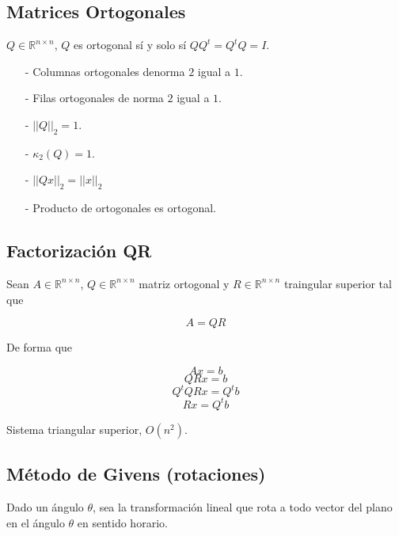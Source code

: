 
\subsection{Matrices Ortogonales}\label{subsec:matrices_ortogonales}

$Q \in \mathbb{R}^{n \times n}$, $Q$ es ortogonal sí y solo sí $QQ^t = Q^t Q = I$.

\begin{itemize}
    \item[-] Columnas ortogonales denorma $2$ igual a $1$.
    \item[-] Filas ortogonales de norma $2$ igual a $1$.
    \item[-] ${||Q||}_{2} = 1$.
    \item[-] $\kappa_{2}(Q) = 1$.
    \item[-] ${||Qx||}_{2} = {||x||}_{2}$
    \item[-] Producto de ortogonales es ortogonal.
\end{itemize}

\subsection{Factorización QR}\label{subsec:proposicion_fact_qr}

Sean $A \in \mathbb{R}^{n \times n}$, $Q \in \mathbb{R}^{n \times n}$ matriz ortogonal y $R \in \mathbb{R}^{n \times n}$ traingular superior tal que

\[A = QR\]

\noindent De forma que

\[Ax = b\]
\[QRx = b\]
\[Q^{t}QRx = Q^{t}b\]
\[Rx = Q^{t}b\]

Sistema triangular superior, $O(n^2)$.

\subsection{Método de Givens (rotaciones)}\label{subsec:metodo_de_givens}

Dado un ángulo $\theta$, sea la transformación lineal que rota a todo vector del plano en el ángulo $\theta$ en sentido horario.

\

